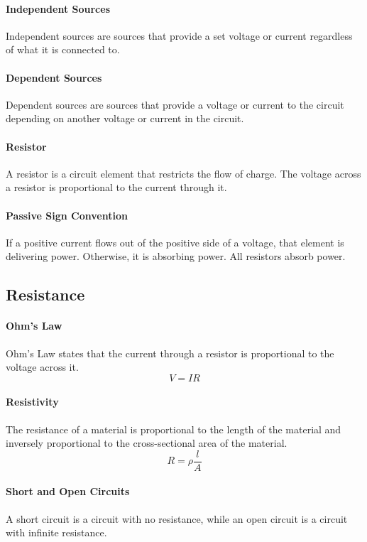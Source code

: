\documentclass[11pt]{article}
\begin{document}
\paragraph{Independent Sources} Independent sources are sources that provide a set voltage or current regardless of what it is connected to.
\paragraph{Dependent Sources} Dependent sources are sources that provide a voltage or current to the circuit depending on another voltage or current in the circuit.
\paragraph{Resistor} A resistor is a circuit element that restricts the flow of charge. The voltage across a resistor is proportional to the current through it.
\paragraph{Passive Sign Convention} If a positive current flows out of the positive side of a voltage, that element is delivering power. Otherwise, it is absorbing power. All resistors absorb power.
\subsection{Resistance}
\paragraph{Ohm's Law} Ohm's Law states that the current through a resistor is proportional to the voltage across it.
\begin{equation}
    V = IR
\end{equation}
\paragraph{Resistivity} The resistance of a material is proportional to the length of the material and inversely proportional to the cross-sectional area of the material.
\begin{equation}
    R = \rho \frac{l}{A}
\end{equation}
\paragraph{Short and Open Circuits} A short circuit is a circuit with no resistance, while an open circuit is a circuit with infinite resistance.
\end{document}
